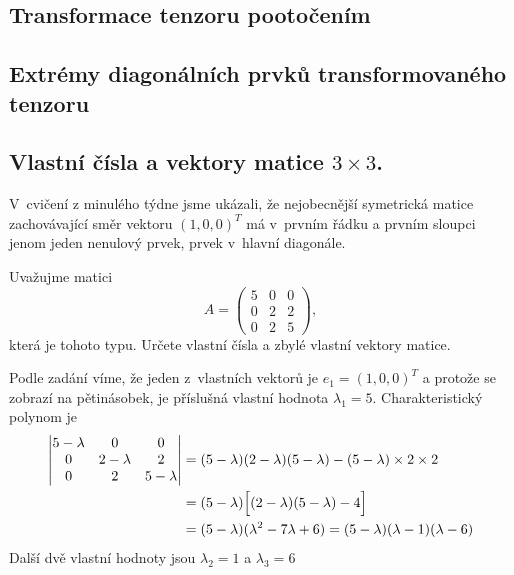 




\subsection{Transformace tenzoru pootočením}

\subsection{Extrémy diagonálních prvků transformovaného tenzoru}

 
\stranka
\subsection{Vlastní čísla a vektory matice $3\times 3$.}

V cvičení z minulého týdne jsme ukázali, že nejobecnější symetrická matice zachovávající směr vektoru  $(1,0,0)^T$ má v prvním řádku a prvním sloupci jenom jeden nenulový prvek, prvek v hlavní diagonále.

Uvažujme matici
\begin{equation*}
A=  \begin{pmatrix}
  5 & 0 & 0\\
  0 & 2 & 2\\
  0 & 2 & 5
\end{pmatrix},
\end{equation*}
která je tohoto typu.
Určete vlastní čísla a zbylé vlastní vektory matice.


\reseni
Podle zadání víme, že jeden z vlastních vektorů je $e_1=(1,0,0)^T$ a protože se zobrazí na pětinásobek, je příslušná vlastní hodnota $\lambda_1=5$. Charakteristický polynom je
\begin{equation*}
  \begin{aligned}
  \begin{vmatrix}
  5-\lambda & 0 & 0\\
  0 & 2-\lambda & 2\\
  0 & 2 & 5-\lambda
\end{vmatrix}
&=(5-\lambda)(2-\lambda)(5-\lambda)-(5-\lambda)\times 2\times 2\\& =
(5-\lambda)\Bigl[(2-\lambda)(5-\lambda) -4\Bigr]
\\&=(5-\lambda)(\lambda^2 -7\lambda +6)
=(5-\lambda)(\lambda-1)(\lambda-6)
\end{aligned}
\end{equation*}
Další dvě vlastní hodnoty jsou $\lambda_2=1$ a $\lambda_3=6$

